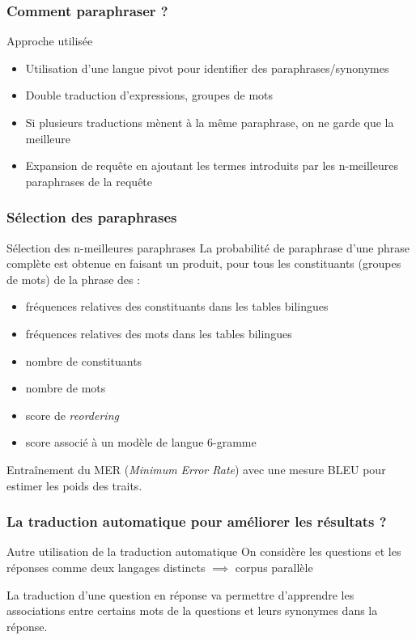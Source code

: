 \documentclass[10pt]{beamer}
\begin{document}
\begin{frame}
  \frametitle{Comment paraphraser ?}
  \begin{block}{Approche utilisée}
  \begin{itemize}
    \item Utilisation d'une langue pivot pour identifier des paraphrases/synonymes
    \item Double traduction d'expressions, groupes de mots
    \item Si plusieurs traductions mènent à la même paraphrase, on ne garde que la meilleure
    \item Expansion de requête en ajoutant les termes introduits par les n-meilleures paraphrases de la requête
  \end{itemize}
  \end{block}
\end{frame}

\begin{frame}
  \frametitle{Sélection des paraphrases}
  \begin{block}{Sélection des n-meilleures paraphrases}
  La probabilité de paraphrase d'une phrase complète est obtenue en faisant un produit, pour tous les constituants (groupes de mots) de la phrase des :
  \begin{itemize}
    \item fréquences relatives des constituants dans les tables bilingues
    \item fréquences relatives des mots dans les tables bilingues
    \item nombre de constituants
    \item nombre de mots
    \item score de \textit{reordering}
    \item score associé à un modèle de langue 6-gramme
  \end{itemize}
  Entra\^inement du MER (\textit{Minimum Error Rate}) avec une mesure BLEU pour estimer les poids des traits.
  \end{block}
\end{frame}

\begin{frame}
  \frametitle{La traduction automatique pour améliorer les résultats
    ?}
  \begin{block}{Autre utilisation de la traduction automatique}
  On considère les questions et les réponses comme deux langages distincts $\implies$ corpus parallèle
  
  La traduction d'une question en réponse va permettre d'apprendre les associations entre certains mots de la questions et leurs synonymes dans la réponse.
  \end{block}
\end{frame}
\end{document}
